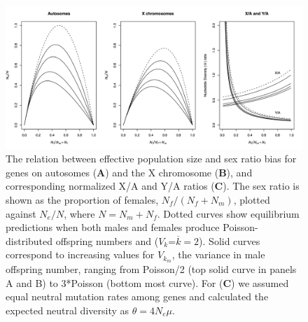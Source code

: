 \documentclass[9pt,twocolumn,twoside]{gsajnl}
\begin{document}
\begin{figure}[htbp]
\centering
\noindent
\includegraphics[width=\linewidth]{figure1.jpg}
\caption{The relation between effective population size and sex ratio bias for genes on autosomes (\textbf{A}) and the X chromosome (\textbf{B}), and corresponding normalized X/A and Y/A ratios (\textbf{C}). The sex ratio is shown as the proportion of females, $N_{f}/(N_{f}+N_{m})$, plotted against $N_{e}/N$, where $N=N_{m}+N_{f}$. Dotted curves show equilibrium predictions when both males and females produce Poisson-distributed offspring numbers and ($V_{k}$=$\overline{k}=2$). Solid curves correspond to increasing values for $V_{k_{m}}$, the variance in male offspring number, ranging from Poisson/2 (top solid curve in panels A and B) to 3*Poisson (bottom most curve). For (\textbf{C}) we assumed equal neutral mutation rates among genes and calculated the expected neutral diversity as $\theta=4N_{e}\mu$.
}
\label{fig:spectrum}
\end{figure}
\end{document}
